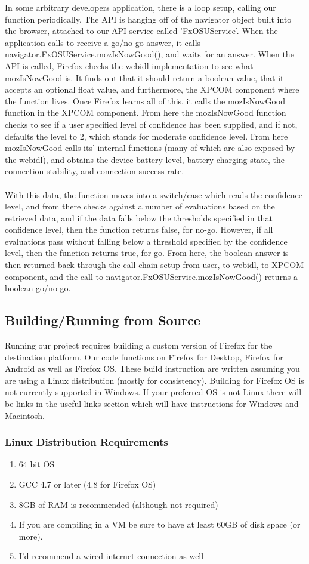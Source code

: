 \documentclass[12pt]{article}
\begin{document}
In some arbitrary developers application, there is a loop setup, calling our function periodically. The API is hanging off of the navigator object built into the browser, attached to our API service called 'FxOSUService'. When the application calls to receive a go/no-go answer, it calls navigator.FxOSUService.mozIsNowGood(), and waits for an answer. When the API is called, Firefox checks the webidl implementation to see what mozIsNowGood is. It finds out that it should return a boolean value, that it accepts an optional float value, and furthermore, the XPCOM component where the function lives. Once Firefox learns all of this, it calls the mozIsNowGood function in the XPCOM component. From here the mozIsNowGood function checks to see if a user specified level of confidence has been supplied, and if not, defaults the level to 2, which stands for moderate confidence level. From here mozIsNowGood calls its' internal functions (many of which are also exposed by the webidl), and obtains the device battery level, battery charging state, the connection stability, and connection success rate.
\\\\
With this data, the function moves into a switch/case which reads the confidence level, and from there checks against a number of evaluations based on the retrieved data, and if the data falls below the thresholds specified in that confidence level, then the function returns false, for no-go. However, if all evaluations pass without falling below a threshold specified by the confidence level, then the function returns true, for go. From here, the boolean answer is then returned back through the call chain setup from user, to webidl, to XPCOM component, and the call to navigator.FxOSUService.mozIsNowGood() returns a boolean go/no-go.

\subsection{Building/Running from Source}
Running our project requires building a custom version of Firefox for the destination platform.  Our code 
functions on Firefox for Desktop, Firefox for Android as well as Firefox OS.  These build instruction are
written assuming you are using a Linux distribution (mostly for consistency). Building for Firefox OS is not currently supported in Windows. If your preferred OS is not Linux there will be links in the useful links section which will have instructions for Windows and Macintosh. 
\subsubsection{Linux Distribution Requirements}
	\begin{enumerate}
		\item 64 bit OS
		\item GCC 4.7 or later (4.8 for Firefox OS)
		\item 8GB of RAM is recommended (although not required)
		\item If you are compiling in a VM be sure to have at least 60GB of disk space (or more).
		\item I'd recommend a wired internet connection as well
	\end{enumerate}
\end{document}
